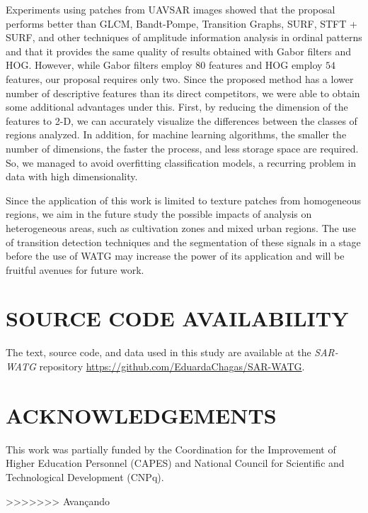 \documentclass[journal]{IEEEtran}
\begin{document}
Experiments using patches from UAVSAR images showed that the proposal performs better than GLCM, Bandt-Pompe, Transition Graphs, SURF, STFT + SURF, and other techniques of amplitude information analysis in ordinal patterns and that it provides the same quality of results obtained with Gabor filters and HOG.
However, while Gabor filters employ $80$ features and HOG employ $54$ features, our proposal requires only two.
Since the proposed method has a lower number of descriptive features than its direct competitors, we were able to obtain some additional advantages under this.
First, by reducing the dimension of the features to 2-D, we can accurately visualize the differences between the classes of regions analyzed.
In addition, for machine learning algorithms, the smaller the number of dimensions, the faster the process, and less storage space are required.
So, we managed to avoid overfitting classification models, a recurring problem in data with high dimensionality.

Since the application of this work is limited to texture patches from homogeneous regions, we aim in the future study the possible impacts of analysis on heterogeneous areas, such as cultivation zones and mixed urban regions.
The use of transition detection techniques and the segmentation of these signals in a stage before the use of WATG may increase the power of its application and will be fruitful avenues for future work.


\section{SOURCE CODE AVAILABILITY} 

The text, source code, and data used in this study are available at the \textit{SAR-WATG} repository \url{https://github.com/EduardaChagas/SAR-WATG}.


%


\section*{ACKNOWLEDGEMENTS}\label{ACKNOWLEDGEMENTS}

This work was partially funded by the Coordination for the Improvement of Higher Education Personnel (CAPES) and National Council for Scientific and Technological Development (CNPq).

>>>>>>> Avançando
\end{document}
